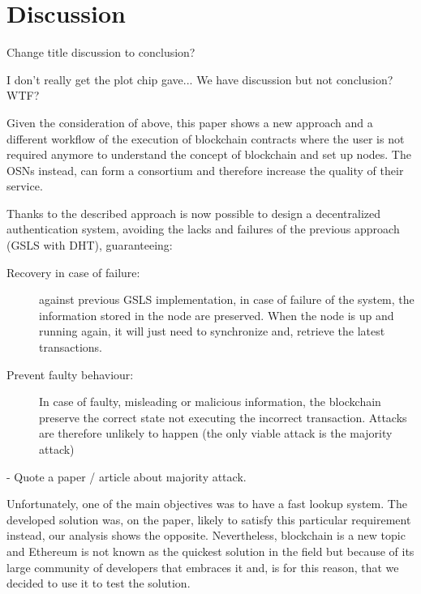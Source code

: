\section{Discussion}
\label{S:6}

\begin{notation}
    Change title discussion to conclusion?

    I don't really get the plot chip gave... We have discussion but not conclusion? WTF?
\end{notation}

Given the consideration of above, this paper shows a new approach and a different workflow of the execution of blockchain contracts where the user is not required anymore to understand the concept of blockchain and set up nodes.
The OSNs instead, can form a consortium and therefore increase the quality of their service.

Thanks to the described approach is now possible to design a decentralized authentication system, avoiding the lacks and failures of the previous approach (GSLS with DHT), guaranteeing:

\begin{description}
    \item[Recovery in case of failure:] against previous GSLS implementation, in case of failure of the system, the information stored in the node are preserved. When the node is up and running again, it will just need to synchronize and, retrieve the latest transactions.
    \item[Prevent faulty behaviour:] In case of faulty, misleading or malicious information, the blockchain preserve the correct state not executing the incorrect transaction. Attacks are therefore unlikely to happen (the only viable attack is the majority attack)
\end{description}

\begin{notation}
    - Quote a paper / article about majority attack.
\end{notation}

Unfortunately, one of the main objectives was to have a fast lookup system.
The developed solution was, on the paper, likely to satisfy this particular requirement instead, our analysis shows the opposite. 
Nevertheless, blockchain is a new topic and Ethereum is not known as the quickest solution in the field but because of its large community of developers that embraces it and, is for this reason, that we decided to use it to test the solution.

